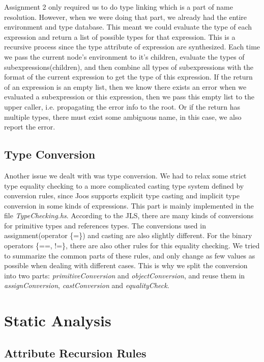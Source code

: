 \documentclass[12pt,letterpaper]{article}
\begin{document}
Assignment 2 only required us to do type linking which is a part of name resolution.
However, when we were doing that part, we already had the entire environment and type database.
This meant we could evaluate the type of each expression and return a list of possible types for that expression.
This is a recursive process since the type attribute of expression are synthesized.
Each time we pass the current node's environment to it's children, evaluate the types of subexpressions(children), and then combine all types of subexpressions with the format of the current expression to get the type of this expression.
If the return of an expression is an empty list, then we know there exists an error when we evaluated a subexpression or this expression, then we pass this empty list to the upper caller, i.e. propagating the error info to the root.
Or if the return has multiple types, there must exist some ambiguous name, in this case, we also report the error.

\subsection{Type Conversion}

Another issue we dealt with was type conversion.
We had to relax some strict type equality checking to a more complicated casting type system defined by conversion rules, since Joos supports explicit type casting and implicit type conversion in some kinds of expressions.
This part is mainly implemented in the file \emph{TypeChecking.hs}.
According to the JLS, there are many kinds of conversions for primitive types and references types.
The conversions used in assignment(operator \{=\}) and casting are also slightly different.
For the binary operators \{==, !=\}, there are also other rules for this equality checking.
We tried to summarize the common parts of these rules, and only change as few values as possible when dealing with different cases.
This is why we split the conversion into two parts: \emph{primitiveConversion} and \emph{objectConversion}, and reuse them in \emph{assignConversion}, \emph{castConversion} and \emph{equalityCheck}.


\section{Static Analysis}

\subsection{Attribute Recursion Rules}
\end{document}
